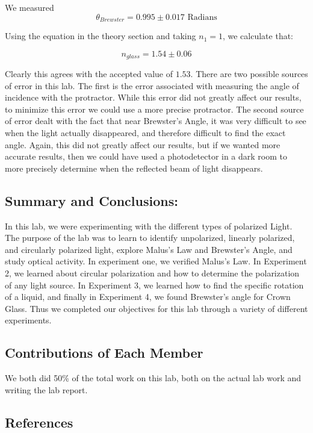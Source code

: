 \documentclass[11pt]{article}
\begin{document}
We measured
\[\boxed{\theta_{Brewster} = 0.995 \pm 0.017 \text{ Radians}}\]

Using the equation in the theory section and taking \(n_1 = 1\), we
calculate that:

\[\boxed{ n_{glass} = 1.54 \pm 0.06 }\]

Clearly this agrees with the accepted value of \(1.53\). There are two
possible sources of error in this lab. The first is the error associated
with measuring the angle of incidence with the protractor. While this
error did not greatly affect our results, to minimize this error we
could use a more precise protractor. The second source of error dealt
with the fact that near Brewster's Angle, it was very difficult to see
when the light actually disappeared, and therefore difficult to find the
exact angle. Again, this did not greatly affect our results, but if we
wanted more accurate results, then we could have used a photodetector in
a dark room to more precisely determine when the reflected beam of light
disappears.

    \hypertarget{summary-and-conclusions}{%
\subsection{Summary and Conclusions:}\label{summary-and-conclusions}}

In this lab, we were experimenting with the different types of polarized
Light. The purpose of the lab was to learn to identify unpolarized,
linearly polarized, and circularly polarized light, explore Malus's Law
and Brewster's Angle, and study optical activity. In experiment one, we
verified Malus's Law. In Experiment 2, we learned about circular
polarization and how to determine the polarization of any light source.
In Experiment 3, we learned how to find the specific rotation of a
liquid, and finally in Experiment 4, we found Brewster's angle for Crown
Glass. Thus we completed our objectives for this lab through a variety
of different experiments.

    \hypertarget{contributions-of-each-member}{%
\subsection{Contributions of Each
Member}\label{contributions-of-each-member}}

We both did 50\% of the total work on this lab, both on the actual lab
work and writing the lab report.

    \hypertarget{references}{%
\subsection{References}\label{references}}
\end{document}
